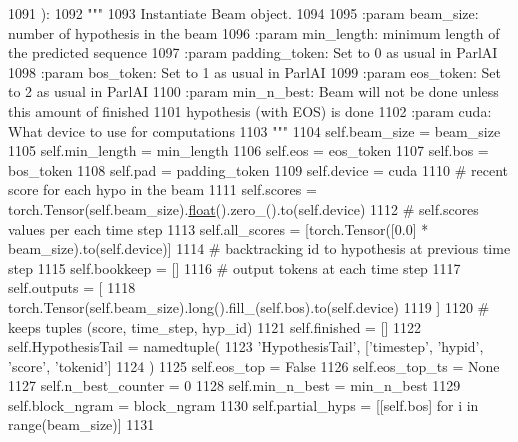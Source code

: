 \begin{DoxyCode}
1091     ):
1092         \textcolor{stringliteral}{"""}
1093 \textcolor{stringliteral}{        Instantiate Beam object.}
1094 \textcolor{stringliteral}{}
1095 \textcolor{stringliteral}{        :param beam\_size: number of hypothesis in the beam}
1096 \textcolor{stringliteral}{        :param min\_length: minimum length of the predicted sequence}
1097 \textcolor{stringliteral}{        :param padding\_token: Set to 0 as usual in ParlAI}
1098 \textcolor{stringliteral}{        :param bos\_token: Set to 1 as usual in ParlAI}
1099 \textcolor{stringliteral}{        :param eos\_token: Set to 2 as usual in ParlAI}
1100 \textcolor{stringliteral}{        :param min\_n\_best: Beam will not be done unless this amount of finished}
1101 \textcolor{stringliteral}{                           hypothesis (with EOS) is done}
1102 \textcolor{stringliteral}{        :param cuda: What device to use for computations}
1103 \textcolor{stringliteral}{        """}
1104         self.beam\_size = beam\_size
1105         self.min\_length = min\_length
1106         self.eos = eos\_token
1107         self.bos = bos\_token
1108         self.pad = padding\_token
1109         self.device = cuda
1110         \textcolor{comment}{# recent score for each hypo in the beam}
1111         self.scores = torch.Tensor(self.beam\_size).\hyperlink{namespaceprojects_1_1controllable__dialogue_1_1make__control__dataset_aa2b7207688c641dbc094ab44eca27113}{float}().zero\_().to(self.device)
1112         \textcolor{comment}{# self.scores values per each time step}
1113         self.all\_scores = [torch.Tensor([0.0] * beam\_size).to(self.device)]
1114         \textcolor{comment}{# backtracking id to hypothesis at previous time step}
1115         self.bookkeep = []
1116         \textcolor{comment}{# output tokens at each time step}
1117         self.outputs = [
1118             torch.Tensor(self.beam\_size).long().fill\_(self.bos).to(self.device)
1119         ]
1120         \textcolor{comment}{# keeps tuples (score, time\_step, hyp\_id)}
1121         self.finished = []
1122         self.HypothesisTail = namedtuple(
1123             \textcolor{stringliteral}{'HypothesisTail'}, [\textcolor{stringliteral}{'timestep'}, \textcolor{stringliteral}{'hypid'}, \textcolor{stringliteral}{'score'}, \textcolor{stringliteral}{'tokenid'}]
1124         )
1125         self.eos\_top = \textcolor{keyword}{False}
1126         self.eos\_top\_ts = \textcolor{keywordtype}{None}
1127         self.n\_best\_counter = 0
1128         self.min\_n\_best = min\_n\_best
1129         self.block\_ngram = block\_ngram
1130         self.partial\_hyps = [[self.bos] \textcolor{keywordflow}{for} i \textcolor{keywordflow}{in} range(beam\_size)]
1131 
\end{DoxyCode}


